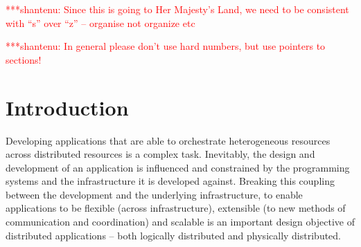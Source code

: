 \documentclass{rspublic}
\newcommand{\jhanote}[1]{ {\textcolor{red} { ***shantenu: #1 }}}
\newcommand{\jhanote}[1]{}
\begin{document}
\begin{abstract}{Replica-Exchange, SAGA, Large-Scale, Production}

\end{abstract}

\jhanote{Since this is going to Her Majesty's Land, we need to be
  consistent with ``s'' over ``z'' -- organise not organize etc}

\jhanote{In general please don't use hard numbers, but use pointers to
  sections!}

\section{Introduction}
Developing applications that are able to orchestrate heterogeneous
resources across distributed resources is a complex task.  Inevitably,
the design and development of an application is influenced and
constrained by the programming systems and the infrastructure it is
developed against. Breaking this coupling between the development and
the underlying infrastructure, to enable applications to be flexible
(across infrastructure), extensible (to new methods of communication
and coordination) and scalable is an important design objective of
distributed applications -- both logically distributed and physically
distributed.
\end{document}
